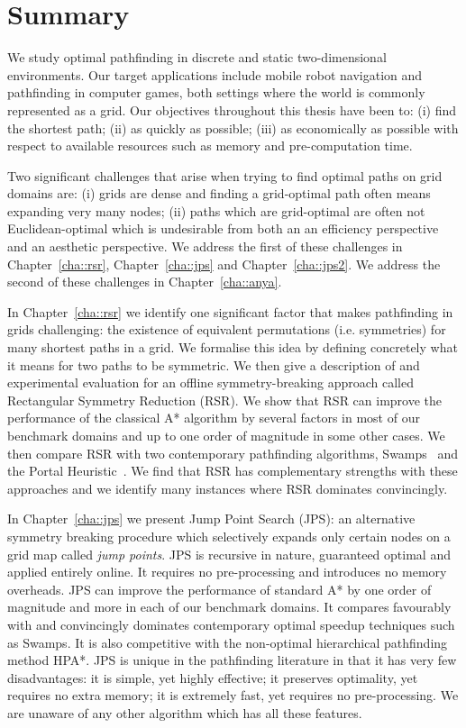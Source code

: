\section{Summary}
\label{cha::conclusion::summary}
We study optimal pathfinding in discrete and static two-dimensional
environments. Our target applications include mobile robot navigation and
pathfinding in computer games, both settings where the world is commonly
represented as a grid. Our objectives throughout this thesis have been to: (i)
find the shortest path; (ii) as quickly as possible; (iii) as economically as
possible with respect to available resources such as memory and
pre-computation time.

Two significant challenges that arise when trying to find optimal
paths on grid domains are: (i) grids are dense and finding a grid-optimal path often
means expanding very many nodes; (ii) paths which are grid-optimal are often
not Euclidean-optimal which is undesirable from both an an efficiency
perspective and an aesthetic perspective. We address the first of these
challenges in Chapter~\ref{cha::rsr}, Chapter~\ref{cha::jps} and
Chapter~\ref{cha::jps2}.  We address the second of these challenges in
Chapter~\ref{cha::anya}.

In Chapter~\ref{cha::rsr} we identify one significant factor that makes
pathfinding in grids challenging: the existence of equivalent permutations 
(i.e. symmetries) for many shortest paths in a grid. We formalise this idea by defining concretely
what it means for two paths to be symmetric. We then give a description of and
experimental evaluation for an offline symmetry-breaking approach called
Rectangular Symmetry Reduction (RSR). We show that RSR can improve the
performance of the classical A{*} algorithm by several factors in most of our
benchmark domains and up to one order of magnitude in some other cases.
We then compare RSR with two contemporary pathfinding algorithms, 
Swamps~\citep{pochter10} and the Portal Heuristic~\citep{goldenberg10}.
We find that RSR has complementary strengths with these approaches and we
identify many instances where RSR dominates convincingly.

In Chapter~\ref{cha::jps} we present Jump Point Search (JPS): an alternative
symmetry breaking procedure which selectively expands only certain nodes on
a grid map called \emph{jump points}.  JPS is recursive in nature,
guaranteed optimal and applied entirely online. It requires no pre-processing
and introduces no memory overheads. JPS can improve the performance of standard
A{*} by one order of magnitude and more in each of our benchmark domains. It
compares favourably with and convincingly dominates contemporary optimal
speedup techniques such as Swamps. It is also competitive with the non-optimal
hierarchical pathfinding method HPA{*}.  JPS is unique in the pathfinding
literature in that it has very few disadvantages: it is simple, yet highly
effective; it preserves optimality, yet requires no extra memory;  it is
extremely fast, yet requires no pre-processing. We are unaware of any 
other algorithm which has all these features.

